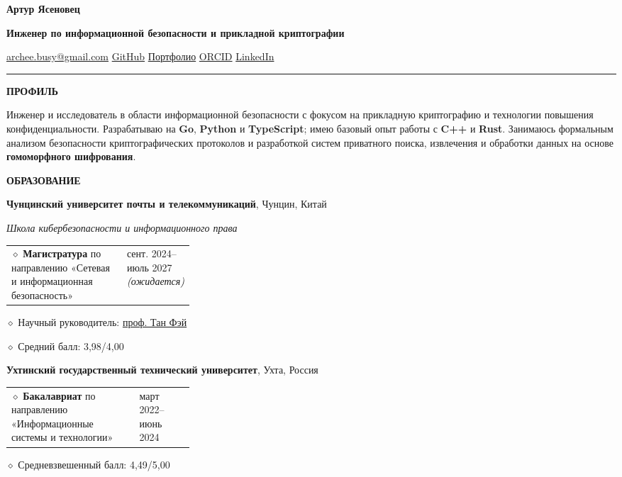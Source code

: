 \documentclass[11pt,a4paper]{article}
\makeatletter
\newcommand{\cvrow}[2]{%
  \noindent
  \begin{minipage}[t]{0.145\textwidth}
    \vspace{0pt}%
    \raggedright
    \fontsize{8.5}{10}\selectfont
    \bfseries\MakeUppercase{#1}
  \end{minipage}%
  \hfill
  \begin{minipage}[t]{0.835\textwidth}
    \vspace{0pt}%
    #2
  \end{minipage}\par
}
\newcommand{\eduentry}[2]{%
  \noindent
  \begin{tabularx}{\linewidth}
    {@{}X@{\hspace{0.8em}}
    >{\raggedleft\arraybackslash}p{0.30\linewidth}@{}}
    #1 & \small #2
  \end{tabularx}\par
  \vspace{0.15em}
}
\newcommand{\edudetail}[1]{%
  \noindent\hspace*{1.15em}$\diamond$ #1\par
}
\makeatother
\begin{document}
{\fontsize{24}{28}\selectfont\bfseries Артур Ясеновец}\par
\vspace{0.08em}
{\large\bfseries Инженер по информационной безопасности и прикладной криптографии}\par
\vspace{0.28em}
\href{mailto:archee.busy@gmail.com}{archee.busy@gmail.com}
\;\textbullet\;
\href{https://github.com/iasenovets}{GitHub}
\;\textbullet\;
\href{https://iasenovets.github.io/}{Портфолио}
\;\textbullet\;
\href{https://orcid.org/0009-0008-0008-3746}{ORCID}
\;\textbullet\;
\href{https://linkedin.com/in/iasenovets}{LinkedIn}
\par
\vspace{0.22em}
\hrule
\vspace{0.55em}

\cvrow{Профиль}{%
  Инженер и исследователь в области информационной безопасности
  с фокусом на прикладную криптографию и технологии повышения
  конфиденциальности. Разрабатываю на \textbf{Go},
  \textbf{Python} и \textbf{TypeScript}; имею базовый опыт работы
  с \textbf{C++} и \textbf{Rust}. Занимаюсь формальным анализом
  безопасности криптографических протоколов и разработкой систем
  приватного поиска, извлечения и обработки данных на основе
  \textbf{гомоморфного шифрования}.
}

\vspace{0.75em}

\cvrow{Образование}{%
  \raggedright

  \textbf{Чунцинский университет почты и телекоммуникаций},
  Чунцин, Китай\par
  \textit{Школа кибербезопасности и информационного права}\par
  \vspace{0.12em}

  \eduentry
    {$\diamond$ \textbf{Магистратура} по направлению «Сетевая и информационная безопасность»}
    {сент. 2024--июль 2027 \textit{(ожидается)}}

  \edudetail{Научный руководитель:
    \href{https://faculty.cqupt.edu.cn/tangfei/en/index.htm}{проф. Тан Фэй}}
  \edudetail{Средний балл: 3,98/4,00}

  \vspace{0.48em}

  \textbf{Ухтинский государственный технический университет},
  Ухта, Россия\par
  \vspace{0.12em}

  \eduentry
    {$\diamond$ \textbf{Бакалавриат} по направлению «Информационные системы и технологии»}
    {март 2022--июнь 2024}

  \edudetail{Средневзвешенный балл: 4,49/5,00}
}
\end{document}
